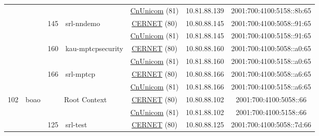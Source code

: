 \begin{small}
\begin{center}
\begin{longtable}{|c|c|c|c|c|c|c|c|}
  &  &  &  & \multicolumn{2}{|c|}{\tiny{\href{http://www.chinaunicom.com}{CnUnicom} (81)}} & \tiny{10.81.88.139} & \tiny{2001:700:4100:5158::8b:65} \\* \cline{3-3}\cline{4-4}\cline{5-5}\cline{6-6}\cline{7-7}\cline{8-8}
  &  & \multirow{2}{*}{\tiny{145}} & \multicolumn{1}{|l|}{\multirow{2}{*}{\tiny{srl-nndemo}}} & \multicolumn{2}{|c|}{\tiny{\href{http://www.cernet.edu.cn}{CERNET} (80)}} & \tiny{10.80.88.145} & \tiny{2001:700:4100:5058::91:65} \\* \cline{5-5}\cline{6-6}\cline{7-7}\cline{8-8}
  &  &  &  & \multicolumn{2}{|c|}{\tiny{\href{http://www.chinaunicom.com}{CnUnicom} (81)}} & \tiny{10.81.88.145} & \tiny{2001:700:4100:5158::91:65} \\* \cline{3-3}\cline{4-4}\cline{5-5}\cline{6-6}\cline{7-7}\cline{8-8}
  &  & \multirow{2}{*}{\tiny{160}} & \multicolumn{1}{|l|}{\multirow{2}{*}{\tiny{kau-mptcpsecurity}}} & \multicolumn{2}{|c|}{\tiny{\href{http://www.cernet.edu.cn}{CERNET} (80)}} & \tiny{10.80.88.160} & \tiny{2001:700:4100:5058::a0:65} \\* \cline{5-5}\cline{6-6}\cline{7-7}\cline{8-8}
  &  &  &  & \multicolumn{2}{|c|}{\tiny{\href{http://www.chinaunicom.com}{CnUnicom} (81)}} & \tiny{10.81.88.160} & \tiny{2001:700:4100:5158::a0:65} \\* \cline{3-3}\cline{4-4}\cline{5-5}\cline{6-6}\cline{7-7}\cline{8-8}
  &  & \multirow{2}{*}{\tiny{166}} & \multicolumn{1}{|l|}{\multirow{2}{*}{\tiny{srl-mptcp}}} & \multicolumn{2}{|c|}{\tiny{\href{http://www.cernet.edu.cn}{CERNET} (80)}} & \tiny{10.80.88.166} & \tiny{2001:700:4100:5058::a6:65} \\* \cline{5-5}\cline{6-6}\cline{7-7}\cline{8-8}
  &  &  &  & \multicolumn{2}{|c|}{\tiny{\href{http://www.chinaunicom.com}{CnUnicom} (81)}} & \tiny{10.81.88.166} & \tiny{2001:700:4100:5158::a6:65} \\ \hline
 \multirow{12}{*}{\tiny{102}} & \multicolumn{1}{|l|}{\multirow{12}{*}{\tiny{boao}}} & \multicolumn{2}{|c|}{\multirow{2}{*}{\tiny{Root Context}}} & \multicolumn{2}{|c|}{\tiny{\href{http://www.cernet.edu.cn}{CERNET} (80)}} & \tiny{10.80.88.102} & \tiny{2001:700:4100:5058::66} \\* \cline{5-5}\cline{6-6}\cline{7-7}\cline{8-8}
  &  & \multicolumn{2}{|c|}{} & \multicolumn{2}{|c|}{\tiny{\href{http://www.chinaunicom.com}{CnUnicom} (81)}} & \tiny{10.81.88.102} & \tiny{2001:700:4100:5158::66} \\* \cline{3-3}\cline{4-4}\cline{5-5}\cline{6-6}\cline{7-7}\cline{8-8}
  &  & \multirow{2}{*}{\tiny{125}} & \multicolumn{1}{|l|}{\multirow{2}{*}{\tiny{srl-test}}} & \multicolumn{2}{|c|}{\tiny{\href{http://www.cernet.edu.cn}{CERNET} (80)}} & \tiny{10.80.88.125} & \tiny{2001:700:4100:5058::7d:66} \\* \cline{5-5}\cline{6-6}\cline{7-7}\cline{8-8}

\end{longtable}
\end{center}
\end{small}
